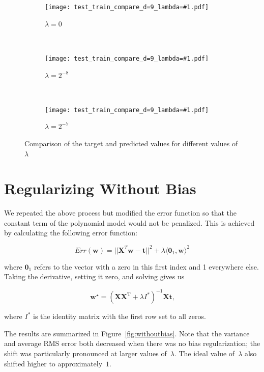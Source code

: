 \documentclass{report}
\newcommand{\wstar}{\mathbf{w}^{\star}}
\newcommand{\includeLambdaPlot}[3]{  
\begin{subfigure}[t]{#2}
  \centering
  \texttt{[image: test\_train\_compare\_d=9\_lambda=\#1.pdf]}
  \caption{$\lambda=#1$}\label{#3}
\end{subfigure}}
\begin{document}
  \begin{figure}[h]
    \centering
    \includeLambdaPlot{0}{0.3\textwidth}{fig:learnedZeroLambda}
    ~ 
    \includeLambdaPlot{2^{-8}}{0.3\textwidth}{fig:learnedTwoPowN8Lambda}
    ~
    \includeLambdaPlot{2^{-7}}{0.3\textwidth}{fig:learnedTwoPowN7Lambda}
    \caption{Comparison of the target and predicted values for different values of $\lambda$}\label{fig:learnerTargetAndPredicted}
  \end{figure}

\section{Regularizing Without Bias}
We repeated the above process but modified the error function so that the constant term of the polynomial model would not be penalized. This is achieved by calculating the following error function:

\[ Err(\mathbf{w}) = ||\mathbf{X}^{T} \mathbf{w}-\mathbf{t}||^{2} + \lambda \langle \mathbf{0}_{1}, \mathbf{w} \rangle^{2}\]

\noindent
where $\mathbf{0}_{1}$ refers to the vector with a zero in this first index and 1 everywhere else. Taking the derivative, setting it zero, and solving gives us

\[ \wstar=(\mathbf{X}\mathbf{X}^{\text{T}} + \lambda I^{*})^{-1}\mathbf{X}\mathbf{t} \textrm{,}\]  

\noindent
where $I^{*}$ is the identity matrix with the first row set to all zeros. 

The results are summarized in Figure~\ref{fig:withoutbias}.  Note that the variance and average RMS error both decreased when there was no bias regularization; the shift was particularly pronounced at larger values of~$\lambda$.  The ideal value of~$\lambda$ also shifted higher to approximately~$1$.
\end{document}
